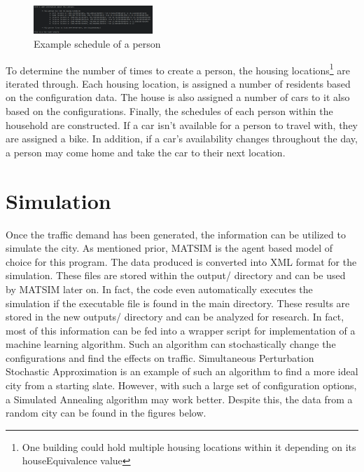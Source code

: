 \documentclass[11pt]{article}
\begin{document}
\begin{multicols}{2}
    \begin{figure}[H]
        \centering
        \includegraphics[width=0.4\textwidth]{images/examplepopulation.png}
        \caption{Example schedule of a person}
        \label{fig:example-schedule}
    \end{figure}

    \quad To determine the number of times to create a person, the housing locations\footnote{One building could hold multiple housing locations within it depending on its houseEquivalence value} are iterated through. Each housing location, is assigned a number of residents based on the configuration data. The house is also assigned a number of cars to it also based on the configurations. Finally, the schedules of each person within the household are constructed. If a car isn't available for a person to travel with, they are assigned a bike. In addition, if a car's availability changes throughout the day, a person may come home and take the car to their next location. \\
    
    \section{Simulation}

    \quad Once the traffic demand has been generated, the information can be utilized to simulate the city. As mentioned prior, MATSIM \cite{matsim} is the agent based model of choice for this program. The data produced is converted into XML format for the simulation. These files are stored within the output/ directory and can be used by MATSIM later on. In fact, the code even automatically executes the simulation if the executable file is found in the main directory. These results are stored in the new outputs/ directory and can be analyzed for research. In fact, most of this information can be fed into a wrapper script for implementation of a machine learning algorithm. Such an algorithm can stochastically change the configurations and find the effects on traffic. Simultaneous Perturbation Stochastic Approximation is an example of such an algorithm to find a more ideal city from a starting slate. However, with such a large set of configuration options, a Simulated Annealing algorithm may work better. Despite this, the data from a random city can be found in the figures below.


\end{multicols}
\end{document}
